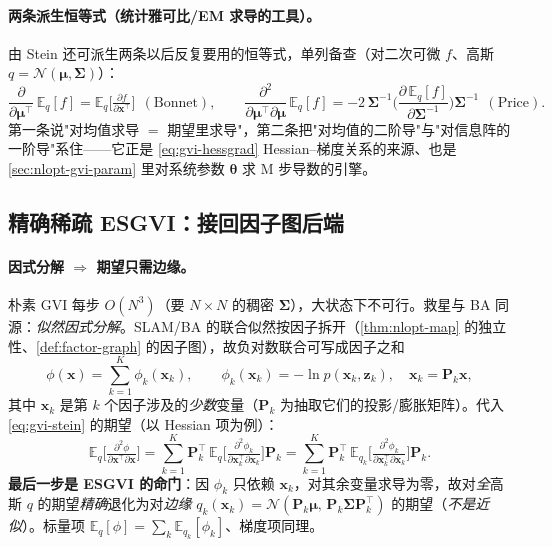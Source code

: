 \paragraph{两条派生恒等式（统计雅可比/EM 求导的工具）。}\cite{barfoot2024state}
由 Stein 还可派生两条以后反复要用的恒等式，单列备查（对二次可微 $f$、高斯 $q=\mathcal{N}(\boldsymbol{\mu},\boldsymbol{\Sigma})$）：
\begin{equation}
  \frac{\partial}{\partial\boldsymbol{\mu}^\top}\,\mathbb{E}_q[f]=\mathbb{E}_q\!\Big[\tfrac{\partial f}{\partial\mathbf{x}^\top}\Big]\ \ (\text{Bonnet}),
  \qquad
  \frac{\partial^2}{\partial\boldsymbol{\mu}^\top\partial\boldsymbol{\mu}}\,\mathbb{E}_q[f]=-2\,\boldsymbol{\Sigma}^{-1}\Big(\frac{\partial\,\mathbb{E}_q[f]}{\partial\boldsymbol{\Sigma}^{-1}}\Big)\boldsymbol{\Sigma}^{-1}\ \ (\text{Price}).
  \label{eq:gvi-stein-id}
\end{equation}
第一条说"对均值求导 $=$ 期望里求导"，第二条把"对均值的二阶导"与"对信息阵的一阶导"系住——它正是 \cref{eq:gvi-hessgrad} Hessian--梯度关系的来源、也是 \cref{sec:nlopt-gvi-param} 里对系统参数 $\boldsymbol{\theta}$ 求 M 步导数的引擎。

\subsection{精确稀疏 ESGVI：接回因子图后端}
\label{sec:nlopt-gvi-sparse}

\paragraph{因式分解 $\Rightarrow$ 期望只需边缘。}
朴素 GVI 每步 $O(N^3)$（要 $N\times N$ 的稠密 $\boldsymbol{\Sigma}$），大状态下不可行。救星与 BA 同源：\emph{似然因式分解}。SLAM/BA 的联合似然按因子拆开（\cref{thm:nlopt-map} 的独立性、\cref{def:factor-graph} 的因子图），故负对数联合可写成因子之和
\begin{equation}
  \phi(\mathbf{x})=\sum_{k=1}^{K}\phi_k(\mathbf{x}_k),\qquad \phi_k(\mathbf{x}_k)=-\ln p(\mathbf{x}_k,\mathbf{z}_k),\quad \mathbf{x}_k=\mathbf{P}_k\mathbf{x},
  \label{eq:gvi-factored}
\end{equation}
其中 $\mathbf{x}_k$ 是第 $k$ 个因子涉及的\emph{少数}变量（$\mathbf{P}_k$ 为抽取它们的投影/膨胀矩阵）。代入 \cref{eq:gvi-stein} 的期望（以 Hessian 项为例）：
\begin{equation}
  \mathbb{E}_q\!\Big[\tfrac{\partial^2\phi}{\partial\mathbf{x}^\top\partial\mathbf{x}}\Big]
  =\sum_{k=1}^{K}\mathbf{P}_k^\top\,\mathbb{E}_{q}\!\Big[\tfrac{\partial^2\phi_k}{\partial\mathbf{x}_k^\top\partial\mathbf{x}_k}\Big]\mathbf{P}_k
  =\sum_{k=1}^{K}\mathbf{P}_k^\top\,\mathbb{E}_{q_k}\!\Big[\tfrac{\partial^2\phi_k}{\partial\mathbf{x}_k^\top\partial\mathbf{x}_k}\Big]\mathbf{P}_k.
  \label{eq:gvi-esgvi-hess}
\end{equation}
\textbf{最后一步是 ESGVI 的命门}：因 $\phi_k$ 只依赖 $\mathbf{x}_k$，对其余变量求导为零，故对\emph{全}高斯 $q$ 的期望\emph{精确}退化为对\emph{边缘} $q_k(\mathbf{x}_k)=\mathcal{N}(\mathbf{P}_k\boldsymbol{\mu},\,\mathbf{P}_k\boldsymbol{\Sigma}\mathbf{P}_k^\top)$ 的期望（\emph{不是近似}）。标量项 $\mathbb{E}_q[\phi]=\sum_k\mathbb{E}_{q_k}[\phi_k]$、梯度项同理。

